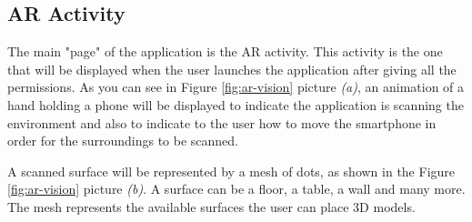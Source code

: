 \subsection{AR Activity}
The main "page" of the application is the \ac{AR} activity. This activity is the one that will be displayed when the user launches the application after giving all the permissions. As you can see in Figure \ref{fig:ar-vision} picture \textit{(a)}, an animation of a hand holding a phone will be displayed to indicate the application is scanning the environment and also to indicate to the user how to move the smartphone in order for the surroundings to be scanned.

A scanned surface will be represented by a mesh of dots, as shown in the Figure \ref{fig:ar-vision} picture \textit{(b)}. A surface can be a floor, a table, a wall and many more. The mesh represents the available surfaces the user can place \ac{3D} models.
